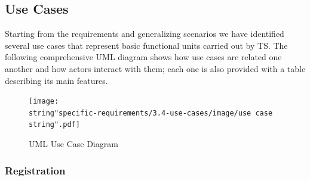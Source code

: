 \begin{landscape}


\subsection{Use Cases}

Starting from the requirements and generalizing scenarios we have
identified several use cases that represent basic functional units
carried out by TS. The following comprehensive UML diagram shows how
use cases are related one another and how actors interact with them;
each one is also provided with a table describing its main features.

\begin{figure}[H]
\begin{centering}
\texttt{[image: \\string"specific-requirements/3.4-use-cases/image/use case\\string".pdf]}
\par\end{centering}

\protect\caption{UML Use Case Diagram}


\end{figure}


\end{landscape}

\clearpage{}


\subsubsection{Registration}

